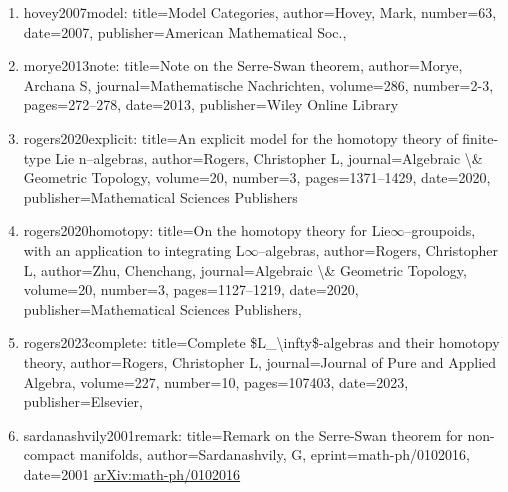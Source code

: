 \documentclass[11pt]{article}
\begin{document}
\begin{enumerate}[leftmargin=*]
  \item hovey2007model: title=Model Categories, author=Hovey, Mark, number=63, date=2007, publisher=American Mathematical Soc.,
  \item morye2013note: title=Note on the Serre-Swan theorem, author=Morye, Archana S, journal=Mathematische Nachrichten, volume=286, number=2-3, pages=272--278, date=2013, publisher=Wiley Online Library
  \item rogers2020explicit: title=An explicit model for the homotopy theory of finite-type Lie n--algebras, author=Rogers, Christopher L, journal=Algebraic \textbackslash{}\& Geometric Topology, volume=20, number=3, pages=1371--1429, date=2020, publisher=Mathematical Sciences Publishers
  \item rogers2020homotopy: title=On the homotopy theory for Lie\ensuremath{\infty}--groupoids, with an application to integrating L\ensuremath{\infty}--algebras, author=Rogers, Christopher L, author=Zhu, Chenchang, journal=Algebraic \textbackslash{}\& Geometric Topology, volume=20, number=3, pages=1127--1219, date=2020, publisher=Mathematical Sciences Publishers,
  \item rogers2023complete: title=Complete \$L\_\textbackslash{}infty\$-algebras and their homotopy theory, author=Rogers, Christopher L, journal=Journal of Pure and Applied Algebra, volume=227, number=10, pages=107403, date=2023, publisher=Elsevier,
  \item sardanashvily2001remark: title=Remark on the Serre-Swan theorem for non-compact manifolds, author=Sardanashvily, G, eprint=math-ph/0102016, date=2001 \href{https://arxiv.org/abs/math-ph/0102016}{arXiv:math-ph/0102016}
\end{enumerate}

% 
% 
\end{document}
